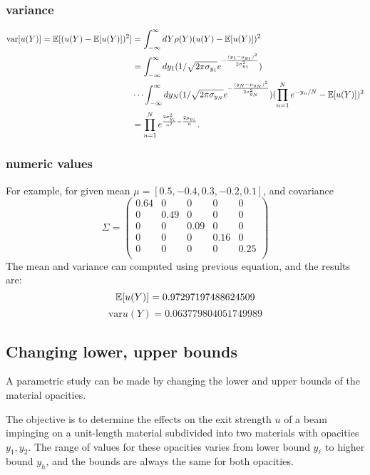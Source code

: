 \subsubsection{variance}
\begin{align}
\text{var}[u(Y)]=\mathbb{E}[ (u(Y)-\mathbb{E}[ u(Y)])^2] &= \int_{-\infty}^\infty dY \rho(Y)(u(Y)-\mathbb{E}[ u(Y)])^2 \notag \\
  &=\int_{-\infty}^\infty dy_1 (1/\sqrt{2 \pi \sigma_{y_1}}e^{-\frac{(y_1-\mu_{y_1})^2}{2\sigma_{y_1}^2}})\\
  &\cdots\int_{-\infty}^\infty dy_N  (1/\sqrt{2 \pi \sigma_{y_N}}e^{-\frac{(y_N-\mu_{y_N})^2}{2\sigma_{y_N}^2}})(\prod_{n=1}^N e^{-y_n/N}-\mathbb{E}[ u(Y)])^2 \notag\\
  &=\prod_{n=1}^N e^{\frac{2 \sigma_{y_i}^2}{n^2}-\frac{2\mu_{y_i}}{n}}. \notag
\end{align}
\subsubsection{numeric values}
For example, for given mean $\mu = [0.5, -0.4, 0.3, -0.2, 0.1]$, and covariance
\begin{equation}
\Sigma =
\begin{pmatrix}
0.64 & 0 & 0 & 0 & 0 \\
0 & 0.49 & 0 & 0 & 0 \\
0 & 0 & 0.09 & 0 & 0 \\
0 & 0 & 0 & 0.16 & 0 \\
0 & 0 & 0 & 0 & 0.25 \\
\end{pmatrix}
\end{equation}
The mean and variance can computed using previous equation, and the results are:
\begin{equation}
\mathbb{E}[ u(Y)] = 0.97297197488624509
\end{equation}
\begin{equation}
\text{var}{u(Y)} = 0.063779804051749989
\end{equation}

\subsection{Changing lower, upper bounds}
A parametric study can be made by changing the lower and upper bounds of the material opacities.

The objective is to determine the effects on the exit strength $u$ of a beam impinging on a
unit-length material subdivided into two materials with opacities $y_1, y_2$.  The range of values for
these opacities varies from lower bound $y_\ell$ to higher bound $y_h$, and the bounds are always
the same for both opacities.

